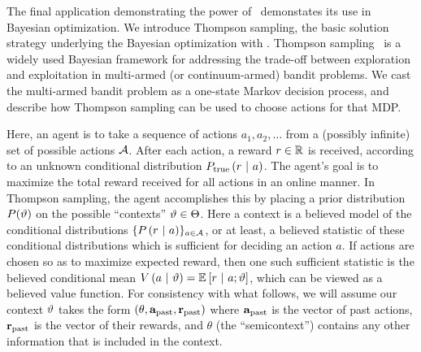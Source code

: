 The final application demonstrating the power of \gpmem\ demonstates its use in Bayesian optimization. We introduce Thompson sampling, the basic solution strategy
underlying the Bayesian optimization with \gpmem.
Thompson sampling~\cite{thompson1933likelihood} is a widely used Bayesian
framework for addressing the trade-off between exploration and exploitation in
multi-armed (or continuum-armed) bandit problems.  
We cast the multi-armed bandit problem as a one-state Markov
decision process, and describe how Thompson sampling can be used to choose
actions for that \ac{MDP}.

Here, an agent is to take a sequence of actions $a_1, a_2,
\ldots$ from a (possibly infinite) set of possible actions $\mathcal{A}$.  After each
action, a reward $r \in \mathbb{R}$ is received, according to an unknown conditional
distribution $P_{\textrm{true}}\left( r \ \middle\vert\  a \right)$.  The agent's goal is to maximize the
total reward received for all actions in an online manner.  In Thompson
sampling, the agent accomplishes this by placing a prior distribution
$P(\vartheta)$ on the possible ``contexts'' $\vartheta \in \Theta$.  Here a context
is a believed model of the conditional distributions $\{P\left( r \ \middle\vert\  a \right)\}_{a
\in \mathcal{A}}$, or at least, a believed statistic of these conditional
distributions which is sufficient for deciding an action $a$.  If actions are
chosen so as to maximize expected reward, then one such sufficient statistic is
the believed conditional mean $V\left( a \ \middle\vert\  \vartheta \right) = \mathbb{E}_{}\left[ r \ \middle\vert\ 
a;\vartheta \right]$, which can be viewed as a believed value function.  For
consistency with what follows, we will assume our context $\vartheta$ takes the
form $(\theta, \mathbf{a}_{\textrm{past}}, \mathbf{r}_{\textrm{past}})$ where $\mathbf{a}_{\textrm{past}}$ is the vector of past
actions, $\mathbf{r}_{\textrm{past}}$ is the vector of their rewards, and $\theta$ (the
``semicontext'') contains any other information that is included in the context.


